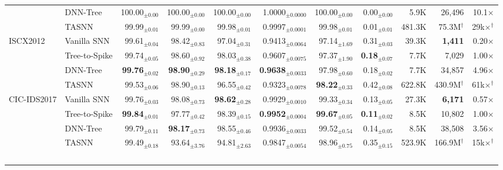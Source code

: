 \begin{table}[!ht]
{\begin{tabular}{l l r r r r r r r r r}
& DNN-Tree      & 100.00$_{\pm0.00}$ & 100.00$_{\pm0.00}$ & 100.00$_{\pm0.00}$ & 1.0000$_{\pm0.0000}$ & 100.00$_{\pm0.00}$ & 0.00$_{\pm0.00}$ & 5.9K & 26,496 & 10.1$\times$ \\
& TASNN         & 99.99$_{\pm0.01}$ & 99.99$_{\pm0.00}$ & 99.98$_{\pm0.01}$ & 0.9997$_{\pm0.0001}$ & 99.98$_{\pm0.01}$ & 0.01$_{\pm0.01}$ & 481.3K & 75.3M$^\dagger$ & 29k$\times$$^\dagger$ \\
\midrule
\multirow{4}{*}{ISCX2012}
& Vanilla SNN   & 99.61$_{\pm0.04}$ & 98.42$_{\pm0.83}$ & 97.04$_{\pm0.31}$ & 0.9413$_{\pm0.0064}$ & 97.14$_{\pm1.69}$ & 0.31$_{\pm0.03}$ & 39.3K & \cellcolor{bestcell}\textbf{1,411} & 0.20$\times$ \\
& Tree-to-Spike & 99.74$_{\pm0.05}$ & 98.60$_{\pm0.92}$ & 98.03$_{\pm0.38}$ & 0.9607$_{\pm0.0075}$ & 97.37$_{\pm1.90}$ & \cellcolor{bestcell}\textbf{0.18$_{\pm0.07}$} & 7.7K & 7,029 & 1.00$\times$ \\
& DNN-Tree      & \cellcolor{bestcell}\textbf{99.76$_{\pm0.02}$} & \cellcolor{bestcell}\textbf{98.90$_{\pm0.29}$} & \cellcolor{bestcell}\textbf{98.18$_{\pm0.17}$} & \cellcolor{bestcell}\textbf{0.9638$_{\pm0.0033}$} & 97.98$_{\pm0.60}$ & 0.18$_{\pm0.02}$ & 7.7K & 34,857 & 4.96$\times$ \\
& TASNN         & 99.53$_{\pm0.06}$ & 98.90$_{\pm0.13}$ & 96.55$_{\pm0.42}$ & 0.9323$_{\pm0.0078}$ & \cellcolor{bestcell}\textbf{98.22$_{\pm0.33}$} & 0.42$_{\pm0.08}$ & 622.8K & 430.9M$^\dagger$ & 61k$\times$$^\dagger$ \\
\midrule
\multirow{4}{*}{CIC-IDS2017}
& Vanilla SNN   & 99.76$_{\pm0.03}$ & 98.08$_{\pm0.73}$ & \cellcolor{bestcell}\textbf{98.62$_{\pm0.28}$} & 0.9929$_{\pm0.0010}$ & 99.33$_{\pm0.34}$ & 0.13$_{\pm0.05}$ & 27.3K & \cellcolor{bestcell}\textbf{6,171} & 0.57$\times$ \\
& Tree-to-Spike & \cellcolor{bestcell}\textbf{99.84$_{\pm0.01}$} & 97.77$_{\pm0.42}$ & 98.39$_{\pm0.15}$ & \cellcolor{bestcell}\textbf{0.9952$_{\pm0.0004}$} & \cellcolor{bestcell}\textbf{99.67$_{\pm0.05}$} & \cellcolor{bestcell}\textbf{0.11$_{\pm0.02}$} & 8.5K & 10,802 & 1.00$\times$ \\
& DNN-Tree      & 99.79$_{\pm0.11}$ & \cellcolor{bestcell}\textbf{98.17$_{\pm0.73}$} & 98.55$_{\pm0.46}$ & 0.9936$_{\pm0.0033}$ & 99.52$_{\pm0.54}$ & 0.14$_{\pm0.05}$ & 8.5K & 38,508 & 3.56$\times$ \\
& TASNN         & 99.49$_{\pm0.18}$ & 93.64$_{\pm3.76}$ & 94.81$_{\pm2.63}$ & 0.9847$_{\pm0.0054}$ & 98.96$_{\pm0.75}$ & 0.35$_{\pm0.15}$ & 523.9K & 166.9M$^\dagger$ & 15k$\times$$^\dagger$ \\
$$
\end{tabular}}
\end{table}

